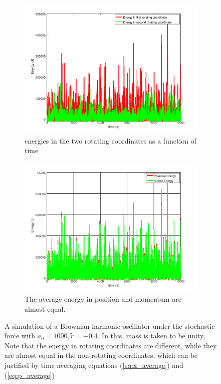 \documentclass[12pt, twoside]{article}
\begin{document}
\begin{figure}[h!]
\begin{subfigure}[h!]{0.45\linewidth}
		\includegraphics[width=\linewidth]{graphs/simulation/rotating_energies.png}
		\caption{energies in the two rotating coordinates as a function of time}
	\end{subfigure}
	\begin{subfigure}[h!]{0.45\linewidth}
		\includegraphics[width=\linewidth]{graphs/simulation/kinetic_potential.png}
		\caption{The average energy in position and momentum are almost equal.}
	\end{subfigure}
	\caption{A simulation of a Brownian harmonic oscillator under the stochastic force with $a_0 = 1000, \tilde{r} = -0.4$. In this, mass is taken to be unity, Note that the energy in rotating coordinates are different, while they are almost equal in the non-rotating coordinates, which can be justified by time averaging equations (\ref{eq:x_average}) and (\ref{eq:p_average})}
	
\end{figure}
\end{document}
